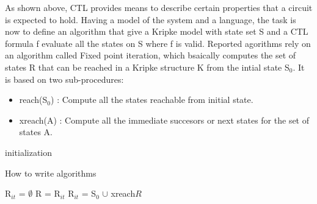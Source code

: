 \documentclass[a4paper,11pt]{article}
\begin{document}
As shown above, CTL provides means to describe certain properties that a circuit is expected to hold. Having a model of the system and a language, the task is now to define an algorithm that give a Kripke model with state set S and a CTL formula f evaluate all the states on S where f is valid. Reported agorithms \cite{thesis:ipc} rely on an algorithm called Fixed point iteration, which bsaically computes the set of states R that can be reached in a Kripke structure K from the intial state S$_0$. It is based on two sub-procedures:
\begin{itemize}
\item reach(S$_0$) : Compute all the states reachable from initial state. 
\item xreach(A) : Compute all the immediate succesors or next states for the set of states A.
\end{itemize}

\begin{algorithm} [H]
\SetAlgoLined
{}
 initialization\;
 \caption{How to write algorithms}
\end{algorithm}

\begin{algorithmic}
\SetAlgoLined
  \item  R$_{it}$ = $\emptyset$\;
  \Do
    \State R = R$_{it}$ \;
    \State R$_{it}$ = S$_0$ $\cup$ xreach\(R\)\; 
\end{algorithmic}
\end{document}
